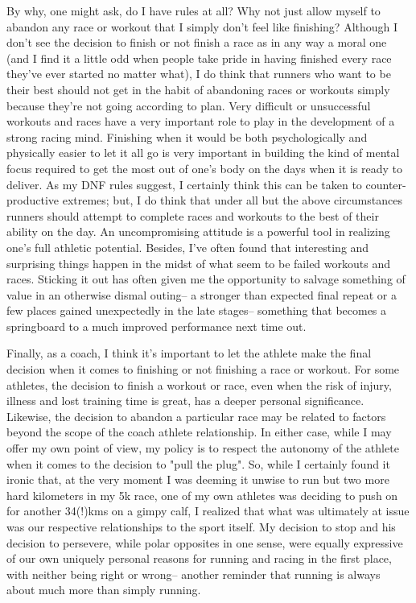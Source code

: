 By why, one might ask, do I have rules at all? Why not just allow myself to abandon any race or workout that I simply don't feel like finishing? Although I don't see the decision to finish or not finish a race as in any way a moral one (and I find it a little odd when people take pride in having finished every race they've ever started no matter what), I do think that runners who want to be their best should not get in the habit of abandoning races or workouts simply because they're not going according to plan. Very difficult or unsuccessful workouts and races have a very important role to play in the development of a strong racing mind. Finishing when it would be both psychologically and physically easier to let it all go is very important in building the kind of mental focus required to get the most out of one's body on the days when it is ready to deliver. As my DNF rules suggest, I certainly think this can be taken to counter-productive extremes; but, I do think that under all but the above circumstances runners should attempt to complete races and workouts to the best of their ability on the day. An uncompromising attitude is a powerful tool in realizing one's full athletic potential. Besides, I've often found that interesting and surprising things happen in the midst of what seem to be failed workouts and races. Sticking it out has often given me the opportunity to salvage something of value in an otherwise dismal outing-- a stronger than expected final repeat or a few places gained unexpectedly in the late stages-- something that becomes a springboard to a much improved performance next time out.

Finally, as a coach, I think it's important to let the athlete make the final decision when it comes to finishing or not finishing a race or workout. For some athletes, the decision to finish a workout or race, even when the risk of injury, illness and lost training time is great, has a deeper personal significance. Likewise, the decision to abandon a particular race may be related to factors beyond the scope of the coach athlete relationship. In either case, while I may offer my own point of view, my policy is to respect the autonomy of the athlete when it comes to the decision to "pull the plug". So, while I certainly found it ironic that, at the very moment I was deeming it unwise to run but two more hard kilometers in my 5k race, one of my own athletes was deciding to push on for another 34(!)kms on a gimpy calf, I realized that what was ultimately at issue was our respective relationships to the sport itself. My decision to stop and his decision to persevere, while polar opposites in one sense, were equally expressive of our own uniquely personal reasons for running and racing in the first place, with neither being right or wrong-- another reminder that running is always about much more than simply running.

